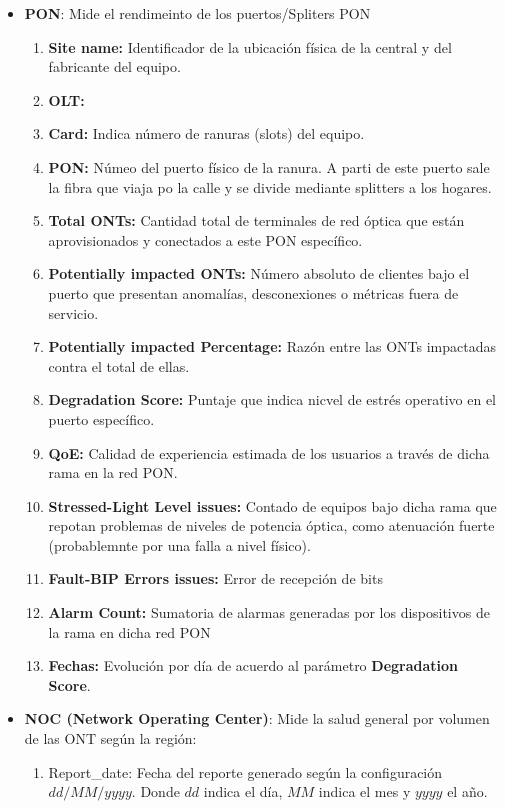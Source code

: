 \documentclass[12pt,a4paper]{article}
\begin{document}
\begin{itemize}
    \item \textbf{PON}: Mide el rendimeinto de los puertos/Spliters PON
   \begin{enumerate}
        \item \textbf{Site name:} Identificador de la ubicación física de la central y del fabricante del equipo.
        \item \textbf{OLT:} 
        \item \textbf{Card:} Indica número de ranuras (slots) del equipo.
        \item \textbf{PON:} Númeo del puerto físico de la ranura. A parti de este puerto sale la fibra  que viaja po la calle y se divide mediante splitters a los hogares.
        \item \textbf{Total ONTs:} Cantidad total de terminales de red óptica que están aprovisionados y conectados a este PON específico.
        \item \textbf{Potentially impacted ONTs:} Número absoluto de clientes bajo el puerto que presentan anomalías, desconexiones o métricas fuera de servicio.
        \item \textbf{Potentially impacted Percentage:} Razón entre las ONTs impactadas contra el total de ellas. 
        \item \textbf{Degradation Score:} Puntaje que indica nicvel de estrés operativo en el puerto específico.
        \item \textbf{QoE:}  Calidad de experiencia estimada de los usuarios a través de dicha rama en la red PON. 
        \item \textbf{Stressed-Light Level issues:} Contado de equipos bajo dicha rama que repotan problemas de niveles de potencia óptica, como atenuación fuerte (probablemnte por una falla a nivel físico).
        \item \textbf{Fault-BIP Errors issues:} Error de recepción de bits %
        \item \textbf{Alarm Count:} Sumatoria de alarmas generadas por los dispositivos de la rama en dicha red PON %
        \item \textbf{Fechas:} Evolución por día de acuerdo al parámetro \textbf{Degradation Score}.  
    \end{enumerate}
    \item \textbf{NOC (Network Operating Center)}: Mide la salud general por volumen de las ONT según la región: 
    \begin{enumerate}
        \item Report\_date: Fecha del reporte generado según la configuración $dd/MM/yyyy$. Donde $dd$ indica el día, $MM$ indica el mes y $yyyy$ el año.

\end{enumerate}
\end{itemize}
\end{document}
